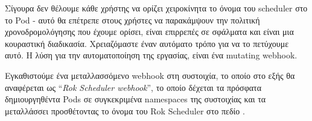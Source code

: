 Σίγουρα δεν θέλουμε κάθε χρήστης να ορίζει χειροκίνητα το όνομα του scheduler
στο το Pod - αυτό θα επέτρεπε στους χρήστες να παρακάμψουν την πολιτική
χρονοδρομολόγησης που έχουμε ορίσει, είναι επιρρεπές σε σφάλματα και είναι μια
κουραστική διαδικασία. Χρειαζόμαστε έναν αυτόματο τρόπο για να το πετύχουμε
αυτό. Η λύση για την αυτοματοποίηση της εργασίας, είναι ένα mutating webhook.

Εγκαθιστούμε ένα μεταλλασσόμενο webhook στη συστοιχία, το οποίο στο εξής θα
αναφέρεται ως ``\textit{Rok Scheduler webhook}'', το οποίο δέχεται τα πρόσφατα
δημιουργηθέντα Pods σε συγκεκριμένα namespaces της συστοιχίας και τα
μεταλλάσσει προσθέτοντας το όνομα του Rok Scheduler στο πεδίο
.